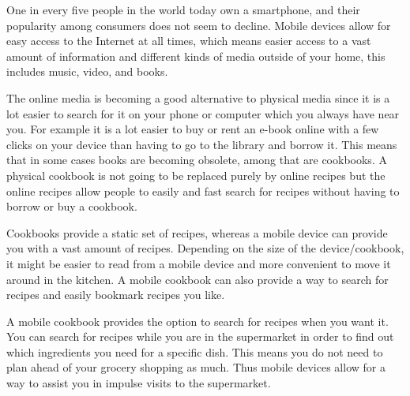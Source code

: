 One in every five people in the world today own a smartphone\cite{peoplesmartphones}, and their popularity among consumers does not seem to decline\citep{mobilegrow}. Mobile devices allow for easy access to the Internet at all times, which means easier access to a vast amount of information and different kinds of media outside of your home, this includes music, video, and books.

The online media is becoming a good alternative to physical media since it is a lot easier to search for it on your phone or computer which you always have near you. 
For example it is a lot easier to buy or rent an e-book online with a few clicks on your device than having to go to the library and borrow it. 
This means that in some cases books are becoming obsolete, among that are cookbooks. 
A physical cookbook is not going to be replaced purely by online recipes but the online recipes allow people to easily and fast search for recipes without having to borrow or buy a cookbook.

Cookbooks provide a static set of recipes, whereas a mobile device can provide you with a vast amount of recipes. Depending on the size of the device/cookbook, it might be easier to read from a mobile device and more convenient to move it around in the kitchen. A mobile cookbook can also provide a way to search for recipes and easily bookmark recipes you like.

A mobile cookbook provides the option to search for recipes when you want it. You can search for recipes while you are in the supermarket in order to find out which ingredients you need for a specific dish. This means you do not need to plan ahead of your grocery shopping as much. Thus mobile devices allow for a way to assist you in impulse visits to the supermarket.
